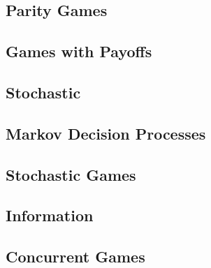 \documentclass[graybox,envcountchap]{svmono}
\begin{document}
\chapter{Parity Games}
\label{3-chap:parity}


\chapter{Games with Payoffs}
\label{4-chap:payoffs}


\begin{partbacktext}
\part{Stochastic}
\label{part:stochastic}
\end{partbacktext}


\chapter{Markov Decision Processes}
\label{5-chap:mdp}


\chapter{Stochastic Games}
\label{6-chap:stochastic}


\begin{partbacktext}
\part{Information}
\label{part:information}
\end{partbacktext}


\chapter{Concurrent Games}
\label{7-chap:concurrent}
\end{document}
